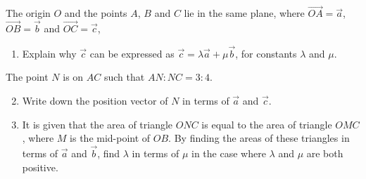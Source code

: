 \documentclass{echw}
\begin{document}

    \problem{}
        \begin{center}
        \end{center}

        The origin $O$ and the points $A$, $B$ and $C$ lie in the same plane, where $\overrightarrow{OA} = \vec a$, $\overrightarrow{OB} = \vec b$ and $\overrightarrow{OC} = \vec c$,

        \begin{enumerate}
            \item Explain why $\vec c$ can be expressed as $\vec c = \lambda \vec a + \mu \vec b$, for constants $\lambda$ and $\mu$.
        \end{enumerate}

        \noindent The point $N$ is on $AC$ such that $AN : NC = 3 : 4$.

        \begin{enumerate}
            \setcounter{enumi}{1}
            \item Write down the position vector of $N$ in terms of $\vec a$ and $\vec c$.
            \item It is given that the area of triangle $ONC$ is equal to the area of triangle $OMC$, where $M$ is the mid-point of $OB$. By finding the areas of these triangles in terms of $\vec a$ and $\vec b$, find $\lambda$ in terms of $\mu$ in the case where $\lambda$ and $\mu$ are both positive.
        \end{enumerate}
\end{document}
